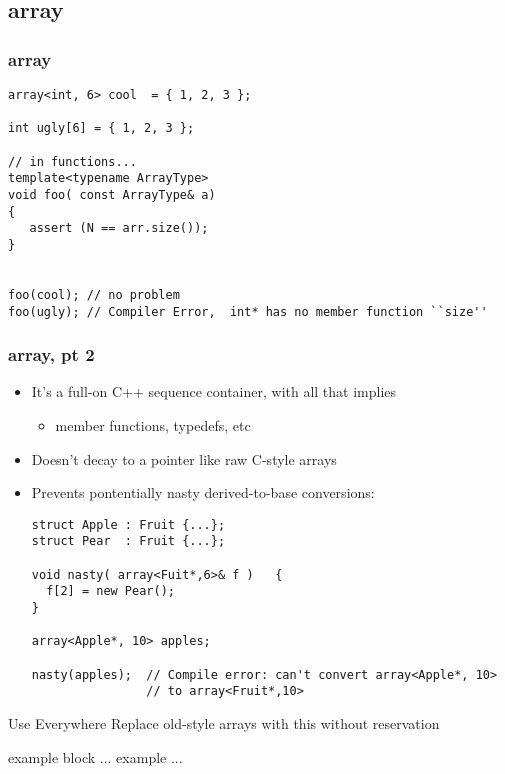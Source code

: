 \subsection{array}

\begin{frame}[fragile]
\frametitle{array}

{\scriptsize\begin{verbatim}
array<int, 6> cool  = { 1, 2, 3 };

int ugly[6] = { 1, 2, 3 };

// in functions...
template<typename ArrayType>
void foo( const ArrayType& a)
{
   assert (N == arr.size());
}


foo(cool); // no problem
foo(ugly); // Compiler Error,  int* has no member function ``size''
\end{verbatim}
}
\end{frame}
\begin{frame}[fragile]
\frametitle{array, pt 2}
\begin{itemize}
\item It's a full-on C++ sequence container, with all that implies
  \begin{itemize}
    \item member functions, typedefs, etc
  \end{itemize}
\item Doesn't decay to a pointer like raw C-style arrays
\item Prevents pontentially nasty derived-to-base conversions:
{\scriptsize\begin{verbatim}
struct Apple : Fruit {...};
struct Pear  : Fruit {...};

void nasty( array<Fuit*,6>& f )   {
  f[2] = new Pear();
}

array<Apple*, 10> apples;

nasty(apples);  // Compile error: can't convert array<Apple*, 10>
                // to array<Fruit*,10>
\end{verbatim}
}
\end{itemize}

\begin{block}{Use Everywhere}
Replace old-style arrays with this without reservation
\end{block}

\begin{exampleblock}{example block}
... example ...
\end{exampleblock}

\end{frame}

